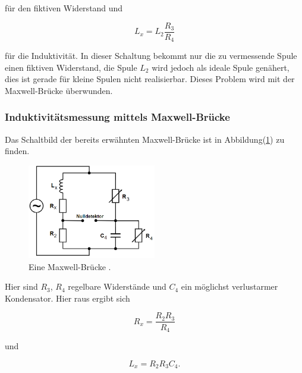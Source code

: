             \noindent für den fiktiven Widerstand und 

            \begin{equation*}
                L_x = L_2 \frac{R_3}{R_4}
            \end{equation*}

            \noindent für die Induktivität. In dieser Schaltung bekommt nur die zu vermessende Spule einen fiktiven Widerstand, die Spule 
            $L_2$ wird jedoch als ideale Spule genähert, dies ist gerade für kleine Spulen nicht realisierbar. Dieses Problem wird mit der 
            Maxwell-Brücke überwunden.

        \subsubsection{Induktivitätsmessung mittels Maxwell-Brücke}

            \noindent Das Schaltbild der bereits erwähnten Maxwell-Brücke ist in Abbildung(\ref{img:Max}) zu finden.

            \begin{figure}[ht]
                \centering
                \includegraphics[width=0.5\textwidth]{latex/images/Maxwell.PNG}
                \caption{Eine Maxwell-Brücke \protect \cite{V302}.}
                \label{img:Max}
            \end{figure}

            \noindent Hier sind $R_3$, $R_4$ regelbare Widerstände und $C_4$ ein möglichst verlustarmer Kondensator.
            Hier raus ergibt sich 

            \begin{equation*}
                R_x = \frac{ R_2 R_3}{R_4}
            \end{equation*}

            \noindent und

            \begin{equation*}
                L_x = R_2 R_3 C_4.
            \end{equation*}

